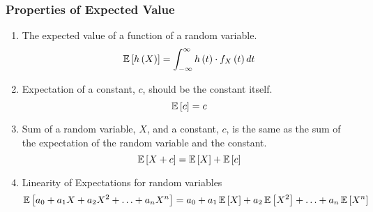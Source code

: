 		\subsubsection{Properties of Expected Value} \label{subsubsec:Properties of Continuous Expected Value}
			\begin{enumerate}[label=\textbf{(\roman*)}, noitemsep, nolistsep]
				\item The expected value of a function of a random variable.
					\begin{equation}
						\operatorname{\operatorname{\mathbb{E}}} \left[ h \left( X \right) \right] = \int_{-\infty}^{\infty} h \left( t \right) \cdot f_{X} \left( t \right) dt
					\end{equation}
				\item Expectation of a constant, $c$, should be the constant itself.
					\begin{equation}
						\operatorname{\operatorname{\mathbb{E}}} \left[ c \right] = c
					\end{equation}
				\item Sum of a random variable, $X$, and a constant, $c$, is the same as the sum of the expectation of the random variable and the constant.
					\begin{equation}
						\operatorname{\operatorname{\mathbb{E}}} \left[ X+c \right] = \operatorname{\operatorname{\mathbb{E}}} \left[ X \right] + \operatorname{\operatorname{\mathbb{E}}} \left[ c \right]
					\end{equation}
				\item Linearity of Expectations for random variables
					\begin{equation}
						\operatorname{\operatorname{\mathbb{E}}} \left[ a_{0} + a_{1}X + a_{2}X^{2} + \ldots + a_{n}X^{n} \right] = a_{0} + a_{1}\operatorname{\operatorname{\mathbb{E}}} \left[ X \right] + a_{2}\operatorname{\operatorname{\mathbb{E}}} \left[ X^{2} \right] + \ldots + a_{n}\operatorname{\operatorname{\mathbb{E}}} \left[ X^{n} \right]
					\end{equation}
			\end{enumerate}
		
